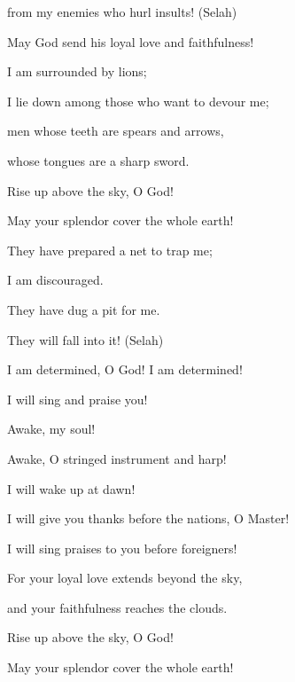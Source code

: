 {\par }{\Q from my enemies
who hurl
insults! (Selah)
\par }{\Q May God
send
his loyal love
and faithfulness!
\par }{\Q {}I
am surrounded by lions;
\par }{\Q I lie down
among
those who want to devour
me;

\par }{\Q men
whose teeth
are spears
and arrows,
\par }{\Q whose tongues
are a sharp
sword.
\par }{\Q {}Rise
up above
the sky,
O God!
\par }{\Q May your splendor
cover the whole
earth!
\par }{\Q {}They have prepared
a net
to trap
me;
\par }{\Q I am discouraged.
\par }{\Q They have dug
a pit
for me.

\par }{\Q They will fall
into
it! (Selah)
\par }{\Q {}I am determined,
O God! I am determined!
\par }{\Q I will sing and praise you!
\par }{\Q {}Awake,
my
soul!

\par }{\Q Awake,
O stringed instrument
and harp!
\par }{\Q I will wake
up at dawn!
\par }{\Q {}I will give you thanks
before the nations,
O Master!
\par }{\Q I will sing praises
to you before foreigners!
\par }{\Q {}For
your loyal love
extends
beyond
the sky,
\par }{\Q and your faithfulness
reaches
the clouds.
\par }{\Q {}Rise
up above
the sky,
O God!
\par }{\Q May your splendor
cover the whole
earth!


\par }
